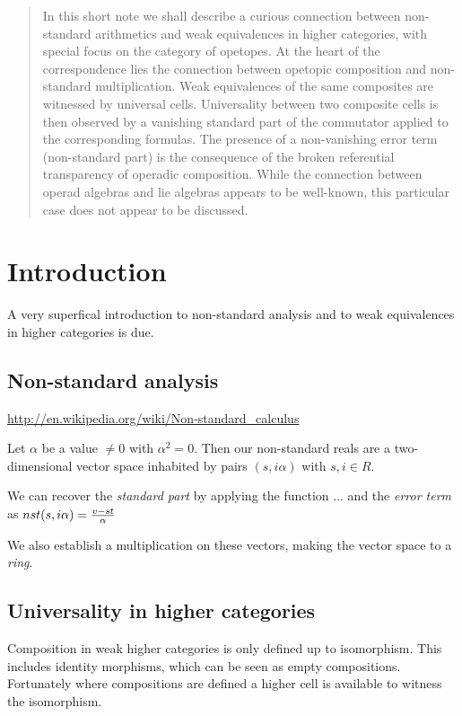 \documentclass{article}
\begin{document}
\begin{abstract}
In this short note we shall describe a curious connection
between non-standard arithmetics and weak equivalences
in higher categories, with special focus on the category of
opetopes. At the heart of the correspondence lies the
connection between opetopic composition and non-standard
multiplication. Weak equivalences of the same composites are
witnessed by universal cells. Universality between two
composite cells is then observed by a vanishing standard
part of the commutator applied to the corresponding formulas.
The presence of a non-vanishing error term (non-standard part)
is the consequence of the broken referential transparency of
operadic composition.
While the connection between operad algebras and
lie algebras appears to be well-known, this particular
case does not appear to be discussed.
\end{abstract}

\section{Introduction}
A very superfical introduction to non-standard analysis
and to weak equivalences in higher categories is due.

\subsection{Non-standard analysis}

\url{http://en.wikipedia.org/wiki/Non-standard_calculus}

Let $\alpha$ be a value $\neq 0$ with $\alpha^2 = 0$. Then
our non-standard reals are a two-dimensional vector space
inhabited by pairs $(s, i \alpha)$ with $s, i \in R$.

We can recover the \emph{standard part} by applying the function
... 
and the \emph{error term} as $nst (s, i\alpha) = {v - st \over \alpha}$

We also establish a multiplication on these vectors, making
the vector space to a \emph{ring}.

\subsection{Universality in higher categories}

Composition in weak higher categories is only defined up to
isomorphism. This includes identity morphisms, which can be
seen as empty compositions. Fortunately where compositions
are defined a higher cell is available to witness the isomorphism.
\end{document}
